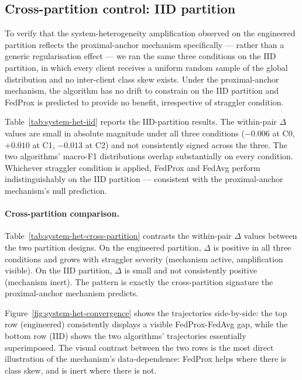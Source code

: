 \subsection{Cross-partition control: IID partition}
\label{sec:system-het-iid}

To verify that the system-heterogeneity amplification observed on the
engineered partition reflects the proximal-anchor mechanism specifically
--- rather than a generic regularisation effect --- we ran the same
three conditions on the IID partition, in which every client receives
a uniform random sample of the global distribution and no inter-client
class skew exists. Under the proximal-anchor mechanism, the algorithm
has no drift to constrain on the IID partition and FedProx is
predicted to provide no benefit, irrespective of straggler condition.

Table~\ref{tab:system-het-iid} reports the IID-partition results. The
within-pair $\Delta$ values are small in absolute magnitude under all
three conditions ($-0.006$ at C0, $+0.010$ at C1, $-0.013$ at C2) and
not consistently signed across the three. The two algorithms' macro-F1
distributions overlap substantially on every condition. Whichever
straggler condition is applied, FedProx and FedAvg perform
indistinguishably on the IID partition --- consistent with the
proximal-anchor mechanism's null prediction.



\paragraph{Cross-partition comparison.}
Table~\ref{tab:system-het-cross-partition} contrasts the
within-pair $\Delta$ values between the two partition designs.
On the engineered partition, $\Delta$ is positive in all three
conditions and grows with straggler severity (mechanism active,
amplification visible). On the IID partition, $\Delta$ is small and
not consistently positive (mechanism inert). The pattern is exactly
the cross-partition signature the proximal-anchor mechanism predicts.



Figure~\ref{fig:system-het-convergence} shows the trajectories
side-by-side: the top row (engineered) consistently displays a
visible FedProx-FedAvg gap, while the bottom row (IID) shows the
two algorithms' trajectories essentially superimposed. The visual
contrast between the two rows is the most direct illustration of
the mechanism's data-dependence: FedProx helps where there is class
skew, and is inert where there is not.

